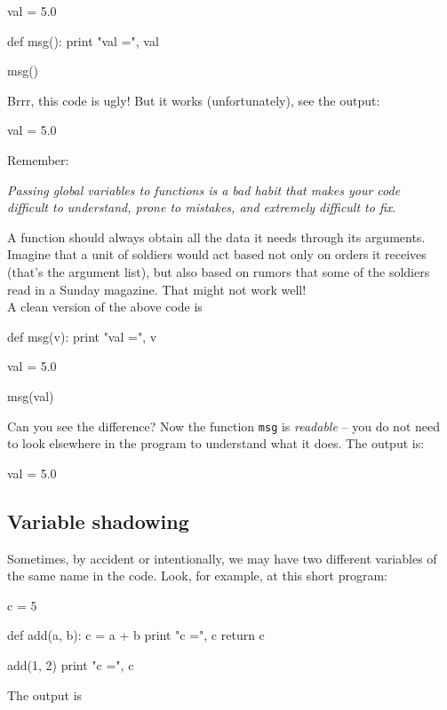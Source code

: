 \begin{bluecode}
val = 5.0

def msg():
    print "val =", val

msg()
\end{bluecode}
Brrr, this code is ugly! But it works (unfortunately), see the output:

\begin{bluecode}
val = 5.0
\end{bluecode}
Remember:\\

\begin{center}
{\em Passing global variables to functions is a bad habit that makes your code\\
     difficult to understand, prone to mistakes, and extremely difficult to fix}.\\
\end{center}
\vspace{4mm}
\noindent
A function should always
obtain all the data it needs through its arguments. Imagine that a unit of soldiers 
would act based not only on orders it receives (that's the argument 
list), but also based on rumors that some of the soldiers read in a Sunday magazine. 
That might not work well!\\

\noindent
A clean version of the above code is

\begin{bluecode}
def msg(v):
    print "val =", v

val = 5.0

msg(val)
\end{bluecode}
Can you see the difference? Now the function {\tt msg} is {\em readable} -- you do not 
need to look elsewhere in the program to understand what it does. The output is:

\begin{bluecode}
val = 5.0
\end{bluecode}

\subsection{Variable shadowing}

Sometimes, by accident or intentionally, we may have two different 
variables of the same name in the code. Look, for example, at this short program:

\begin{bluecode}
c = 5

def add(a, b):
    c = a + b
    print "c =", c
    return c

add(1, 2)
print "c =", c
\end{bluecode}
The output is

